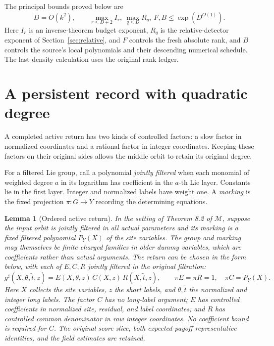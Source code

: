 \documentclass[11pt,a4paper]{article}
\newtheorem{lemma}[theorem]{Lemma}
\theoremstyle{definition}
\newcommand{\M}{\mathcal M}
\begin{document}
The principal bounds proved below are
\[
 D=O(k^2),\qquad
 \max_{r\le D+2}I_r,\ \max_{q\le D}R_q,\ F,B
       \le\exp(D^{O(1)}).
\]
Here \(I_r\) is an inverse-theorem budget exponent, \(R_q\) is the
relative-detector exponent of Section~\ref{sec:relative}, and \(F\) controls the
fresh absolute rank, and \(B\) controls the source's local polynomials
and their descending numerical schedule. The last density calculation
uses the original rank ledger.

\section{A persistent record with quadratic degree}\label{sec:macro}

A completed active return has two kinds of controlled factors: a slow
factor in normalized coordinates and a rational factor in integer
coordinates. Keeping these factors on their original sides allows the
middle orbit to retain its original degree.

For a filtered Lie group, call a polynomial \emph{jointly filtered} when
each monomial of weighted degree \(a\) in its logarithm has coefficient
in the \(a\)-th Lie layer. Constants lie in the first layer. Integer
and normalized labels have weight one. A \emph{marking} is the fixed
projection \(\pi:G\to Y\) recording the determining equations.

\begin{lemma}[Ordered active return]\label{lem:active}
In the setting of Theorem 8.2 of \(\M\), suppose the input orbit is
jointly filtered in all actual parameters and its marking is a fixed
filtered polynomial \(P_Y(X)\) of the site variables. The group and
marking may themselves be finite charged families in older dummy
variables, which are coefficients rather than actual arguments.
The return can be chosen in the form below, with each of \(E,C,R\)
jointly filtered in the original filtration:
\begin{equation}\label{eq:ECR}
 g^\sharp(X,\theta,\widetilde t,z)
   =E(X,\theta,z)\,C(X,z)\,R(X,\widetilde t,z),
 \qquad
 \pi E=\pi R=1,\quad \pi C=P_Y(X).
\end{equation}
Here \(X\) collects the site variables, \(z\) the short labels, and
\(\theta,\widetilde t\) the normalized and integer long labels.
The factor \(C\) has no long-label argument; \(E\) has controlled coefficients
in normalized site, residual, and label coordinates; and \(R\) has
controlled common denominator in raw integer coordinates. No
coefficient bound is required for \(C\). The original score slice,
both expected-payoff representative identities, and the field
estimates are retained.
\end{lemma}
\end{document}
